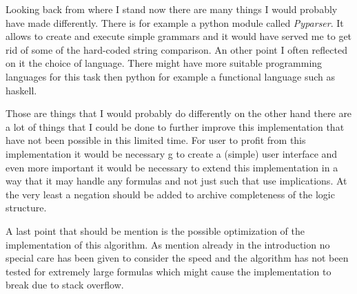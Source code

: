 Looking back from where I stand now there are many things I would probably have made differently. There is for example a python module called \emph{Pyparser}. It allows to create and execute simple grammars and it would have served me to get rid of some of the hard-coded string comparison. An other point I often reflected on it the choice of language. There might have more suitable programming languages for this task then python for example a functional language such as haskell. 

Those are things that I would probably do differently on the other hand there are a lot of things that I could be done to further improve this implementation that have not been possible in this limited time. For user to profit from this implementation it would be necessary g to create a (simple) user interface and even more important it would be necessary to extend this implementation in a way that it may handle any formulas and not just such that use implications. At the very least a negation should be added to archive completeness of the logic structure.

A last point that should be mention is the possible optimization of the implementation of this algorithm. As mention already in the introduction no special care has been given to consider the speed and the algorithm has not been tested for extremely large formulas which might cause the implementation to break due to stack overflow. 